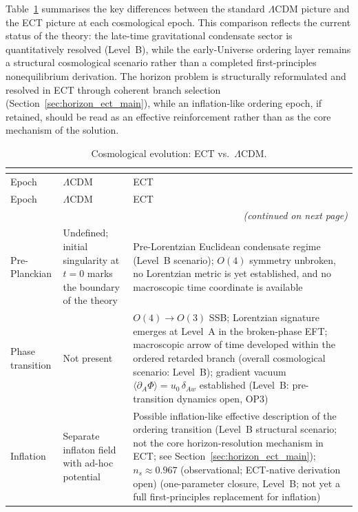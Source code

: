 \documentclass[11pt,a4paper]{article}
\numberwithin{equation}{section}
\begin{document}
Table~\ref{tab:cosmo_vs_lcdm} summarises the key differences between
the standard $\Lambda$CDM picture and the ECT picture at each
cosmological epoch.
This comparison reflects the current status of the theory: the
late-time gravitational condensate sector is quantitatively resolved
(Level~B), while the early-Universe ordering layer remains a structural
cosmological scenario rather than a completed first-principles
nonequilibrium derivation.
The horizon problem is structurally reformulated and resolved in ECT
through coherent branch selection
(Section~\ref{sec:horizon_ect_main}), while an inflation-like ordering
epoch, if retained, should be read as an effective reinforcement rather
than as the core mechanism of the solution.

\begin{longtable}{@{}p{}p{}p{}@{}}
\caption{Cosmological evolution: ECT vs.\ $\Lambda$CDM.} \\
\label{tab:cosmo_vs_lcdm} \\[-6pt]
\toprule
Epoch & $\Lambda$CDM & ECT \\
\midrule
\endfirsthead
\toprule
Epoch & $\Lambda$CDM & ECT \\
\midrule
\endhead
\midrule\multicolumn{3}{r}{\small\textit{(continued on next page)}}\\
\endfoot
\bottomrule
\endlastfoot
Pre-Planckian & Undefined; initial singularity at $t=0$ marks the
  boundary of the theory & Pre-Lorentzian Euclidean condensate regime
  (Level~B scenario); $O(4)$ symmetry unbroken,
  no Lorentzian metric is yet established,
  and no macroscopic time coordinate is available \\
Phase transition & Not present & $O(4)\to O(3)$ SSB; Lorentzian signature
  emerges at Level~A in the broken-phase EFT;
  macroscopic arrow of time developed within the ordered
  retarded branch (overall cosmological scenario: Level~B);
  gradient vacuum $\langle\partial_A\Phi\rangle = u_0\,\delta_{Aw}$
  established (Level~B: pre-transition dynamics open, OP3) \\
Inflation & Separate inflaton field with ad-hoc potential &
  Possible inflation-like effective description of the ordering
  transition (Level~B structural scenario; not the core
  horizon-resolution mechanism in ECT;
  see Section~\ref{sec:horizon_ect_main});
  $n_s \approx 0.967$ (observational; ECT-native derivation open)
  (one-parameter closure, Level~B; not yet a full first-principles
  replacement for inflation) \\

\end{longtable}
\end{document}
